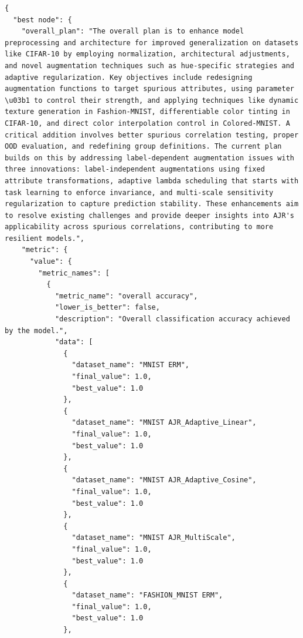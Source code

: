 \begin{appendices}
\begin{tcolorbox}[breakable, colback=orange!5!white, colframe=orange!80!black, title=Example Stage 3 summary]
\begin{Verbatim}[breaklines, breakafter={/,_,-,.}, breaksymbol={}, breaksymbolleft={}, fontsize=\small]
{
  "best node": {
    "overall_plan": "The overall plan is to enhance model preprocessing and architecture for improved generalization on datasets like CIFAR-10 by employing normalization, architectural adjustments, and novel augmentation techniques such as hue-specific strategies and adaptive regularization. Key objectives include redesigning augmentation functions to target spurious attributes, using parameter \u03b1 to control their strength, and applying techniques like dynamic texture generation in Fashion-MNIST, differentiable color tinting in CIFAR-10, and direct color interpolation control in Colored-MNIST. A critical addition involves better spurious correlation testing, proper OOD evaluation, and redefining group definitions. The current plan builds on this by addressing label-dependent augmentation issues with three innovations: label-independent augmentations using fixed attribute transformations, adaptive lambda scheduling that starts with task learning to enforce invariance, and multi-scale sensitivity regularization to capture prediction stability. These enhancements aim to resolve existing challenges and provide deeper insights into AJR's applicability across spurious correlations, contributing to more resilient models.",
    "metric": {
      "value": {
        "metric_names": [
          {
            "metric_name": "overall accuracy",
            "lower_is_better": false,
            "description": "Overall classification accuracy achieved by the model.",
            "data": [
              {
                "dataset_name": "MNIST ERM",
                "final_value": 1.0,
                "best_value": 1.0
              },
              {
                "dataset_name": "MNIST AJR_Adaptive_Linear",
                "final_value": 1.0,
                "best_value": 1.0
              },
              {
                "dataset_name": "MNIST AJR_Adaptive_Cosine",
                "final_value": 1.0,
                "best_value": 1.0
              },
              {
                "dataset_name": "MNIST AJR_MultiScale",
                "final_value": 1.0,
                "best_value": 1.0
              },
              {
                "dataset_name": "FASHION_MNIST ERM",
                "final_value": 1.0,
                "best_value": 1.0
              },

\end{Verbatim}
\end{tcolorbox}
\end{appendices}
